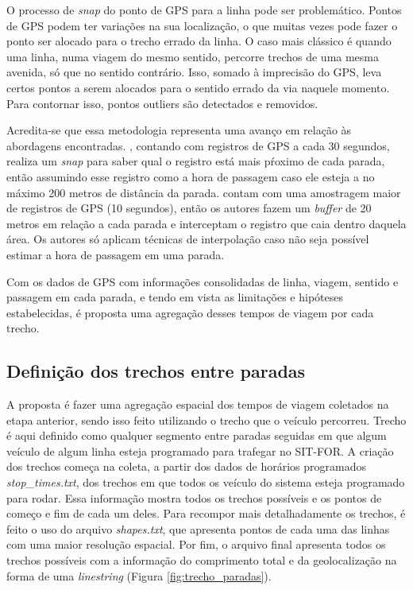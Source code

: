 \documentclass[        
    a4paper,          %
    12pt,             %
    chapter=TITLE,    %
    section=Title,    %
    subsection=Title, %
    oneside,          %
    english,          %
    spanish,          %
    brazil,           %
    fleqn             %
]{abntex2}
\begin{document}
  O processo de \emph{snap} do ponto de GPS para a linha pode ser problemático. Pontos de GPS podem ter variações na sua localização, o que muitas vezes pode fazer o ponto ser alocado para o trecho errado da linha. O caso mais clássico é quando uma linha, numa viagem do mesmo sentido, percorre trechos de uma mesma avenida, só que no sentido contrário. Isso, somado à imprecisão do GPS, leva certos pontos a serem alocados para o sentido errado da via naquele momento. Para contornar isso, pontos outliers são detectados e removidos.
  
  Acredita-se que essa metodologia representa uma avanço em relação às abordagens encontradas. \citet{Arbex2016}, contando com registros de GPS a cada 30 segundos, realiza um \emph{snap} para saber qual o registro está mais pŕoximo de cada parada, então assumindo esse registro como a hora de passagem caso ele esteja a no máximo 200 metros de distância da parada. \citet{Wessel2017} contam com uma amostragem maior de registros de GPS (10 segundos), então os autores fazem um \emph{buffer} de 20 metros em relação a cada parada e interceptam o registro que caia dentro daquela área. Os autores só aplicam técnicas de interpolação caso não seja possível estimar a hora de passagem em uma parada.
  
  Com os dados de GPS com informações consolidadas de linha, viagem, sentido e passagem em cada parada, e tendo em vista as limitações e hipóteses estabelecidas, é proposta uma agregação desses tempos de viagem por cada trecho.
  
  \hypertarget{definicao-dos-trechos-entre-paradas}{%
  \subsection{Definição dos trechos entre paradas}\label{definicao-dos-trechos-entre-paradas}}
  
  A proposta é fazer uma agregação espacial dos tempos de viagem coletados na etapa anterior, sendo isso feito utilizando o trecho que o veículo percorreu. Trecho é aqui definido como qualquer segmento entre paradas seguidas em que algum veículo de algum linha esteja programado para trafegar no SIT-FOR. A criação dos trechos começa na coleta, a partir dos dados de horários programados \emph{stop\_times.txt}, dos trechos em que todos os veículo do sistema esteja programado para rodar. Essa informação mostra todos os trechos possíveis e os pontos de começo e fim de cada um deles. Para recompor mais detalhadamente os trechos, é feito o uso do arquivo \emph{shapes.txt}, que apresenta pontos de cada uma das linhas com uma maior resolução espacial. Por fim, o arquivo final apresenta todos os trechos possíveis com a informação do comprimento total e da geolocalização na forma de uma \emph{linestring} (Figura \ref{fig:trecho_paradas}).
  
\end{document}
